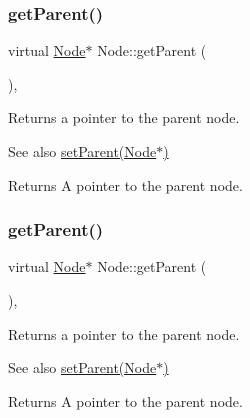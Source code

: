 \mbox{\label{classNode_af4c8a4ae726c6dd984db05c89454652d}} 
\subsubsection{\texorpdfstring{get\+Parent()}{getParent()}\hspace{0.1cm}{\footnotesize\ttfamily [1/2]}}
{\footnotesize\ttfamily virtual \hyperlink{classNode}{Node}$\ast$ Node\+::get\+Parent (\begin{DoxyParamCaption}{ }\end{DoxyParamCaption})\hspace{0.3cm}{\ttfamily [inline]}, {\ttfamily [virtual]}}

Returns a pointer to the parent node.

\begin{DoxySeeAlso}{See also}
{\ttfamily \hyperlink{classNode_ab5f0786bcb59591c528efb0b776797fc}{set\+Parent(\+Node$\ast$)}}
\end{DoxySeeAlso}
\begin{DoxyReturn}{Returns}
A pointer to the parent node. 
\end{DoxyReturn}
\mbox{\label{classNode_af4c8a4ae726c6dd984db05c89454652d}} 
\subsubsection{\texorpdfstring{get\+Parent()}{getParent()}\hspace{0.1cm}{\footnotesize\ttfamily [2/2]}}
{\footnotesize\ttfamily virtual \hyperlink{classNode}{Node}$\ast$ Node\+::get\+Parent (\begin{DoxyParamCaption}{ }\end{DoxyParamCaption})\hspace{0.3cm}{\ttfamily [inline]}, {\ttfamily [virtual]}}

Returns a pointer to the parent node.

\begin{DoxySeeAlso}{See also}
{\ttfamily \hyperlink{classNode_ab5f0786bcb59591c528efb0b776797fc}{set\+Parent(\+Node$\ast$)}}
\end{DoxySeeAlso}
\begin{DoxyReturn}{Returns}
A pointer to the parent node. 
\end{DoxyReturn}
\mbox{\label{classNode_a12aae4242a85aa5acfc03c97a018b621}} 
